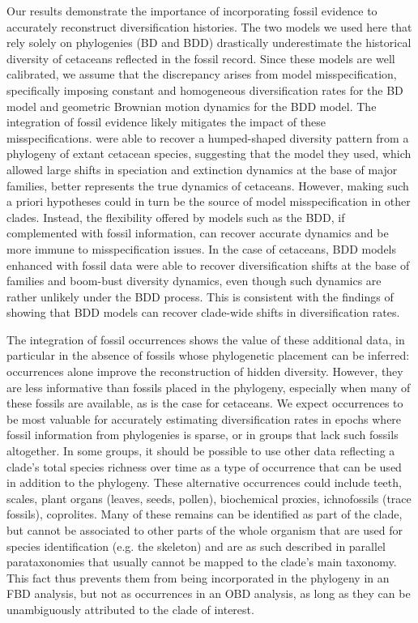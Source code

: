 \documentclass[oupdraft]{sysbio}
\begin{document}
Our results demonstrate the importance of incorporating fossil evidence to accurately reconstruct diversification histories. The two models we used here that rely solely on phylogenies (BD and BDD) drastically underestimate the historical diversity of cetaceans reflected in the fossil record. Since these models are well calibrated, we assume that the discrepancy arises from model misspecification, specifically imposing constant and homogeneous diversification rates for the BD model and geometric Brownian motion dynamics for the BDD model. The integration of fossil evidence likely mitigates the impact of these misspecifications. \citet{morlon_reconciling_2011, mazet_estimating_2023} were able to recover a humped-shaped diversity pattern from a phylogeny of extant cetacean species, suggesting that the model they used, which allowed large shifts in speciation and extinction dynamics at the base of major families, better represents the true dynamics of cetaceans. However, making such a priori hypotheses could in turn be the source of model misspecification in other clades. Instead, the flexibility offered by models such as the BDD, if complemented with fossil information, can recover accurate dynamics and be more immune to misspecification issues. In the case of cetaceans, BDD models enhanced with fossil data were able to recover diversification shifts at the base of families and boom-bust diversity dynamics, even though such dynamics are rather unlikely under the BDD process. This is consistent with the findings of \citet{quintero_imbalanced_2024} showing that BDD models can recover clade-wide shifts in diversification rates. 

The integration of fossil occurrences shows the value of these additional data, in particular in the absence of fossils whose phylogenetic placement can be inferred: occurrences alone improve the reconstruction of hidden diversity. However, they are less informative than fossils placed in the phylogeny, especially when many of these fossils are available, as is the case for cetaceans. We expect occurrences to be most valuable for accurately estimating diversification rates in epochs where fossil information from phylogenies is sparse, or in groups that lack such fossils altogether. In some groups, it should be possible to use other data reflecting a clade's total species richness over time as a type of occurrence that can be used in addition to the phylogeny. These alternative occurrences could include teeth, scales, plant organs (leaves, seeds, pollen), biochemical proxies, ichnofossils (trace fossils), coprolites. Many of these remains can be identified as part of the clade, but cannot be associated to other parts of the whole organism that are used for species identification (e.g. the skeleton) and are as such described in parallel parataxonomies that usually cannot be mapped to the clade's main taxonomy. This fact thus prevents them from being incorporated in the phylogeny in an FBD analysis, but not as occurrences in an OBD analysis, as long as they can be unambiguously attributed to the clade of interest.
\end{document}
